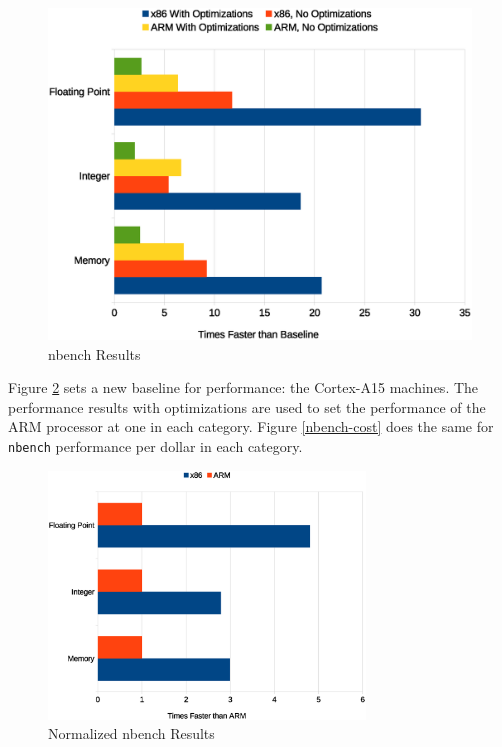 \documentclass[11pt]{book}
\begin{document}
\begin{figure}
\centering
\includegraphics[width=\textwidth]{nbench_all}
\caption{nbench Results}
\label{nbench-all}
\end{figure}

Figure \ref{nbench-performance} sets a new baseline for performance: the Cortex-A15
machines.  The performance results with optimizations are used to set the performance of
the ARM processor at one in each category.  Figure \ref{nbench-cost} does the same for
\verb;nbench; performance per dollar in each category.

\begin{figure}
\centering
\includegraphics[width=0.75\textwidth]{nbench_performance}
\caption{Normalized nbench Results}
\label{nbench-performance}
\end{figure}
\end{document}
